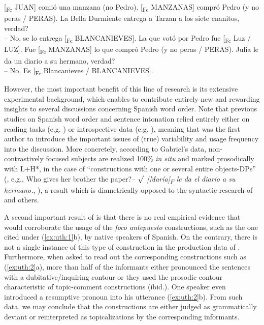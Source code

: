 \documentclass[output=paper]{langsci/langscibook}
\begin{document}
\ea%
    \label{ex:uth:1}
    \ea{}  [\textsubscript{Fc} JUAN] comió una manzana (no Pedro). 
    \ex{}  [\textsubscript{Fc} MANZANAS] compró Pedro (y no peras / PERAS). 
    \ex{}	La Bella Durmiente entrega a Tarzan a los siete enanitos, verdad? \\
      – No, se lo entrega [\textsubscript{Fc} BLANCANIEVES].
    \ex La que votó por Pedro fue [\textsubscript{Fc} Luz / LUZ].
    \ex Fue [\textsubscript{Fc} MANZANAS] lo que compró Pedro (y no peras / PERAS).
    \ex Julia le da un diario a su hermano, verdad?\\
      – No, Es [\textsubscript{Fc} Blancanieves / BLANCANIEVES]. 
      \z
      \z

However, the most important benefit of this line of research is its extensive experimental background, which enables \citet{Gabriel2007} to contribute entirely new and rewarding insights to several discussions concerning Spanish word order. Note that previous studies on Spanish word order and sentence intonation relied entirely either on reading tasks (e.g. \citealt{Dominguez04,Face2002,Hualde2005}) or introspective data (e.g. \citealt{Zubizarreta98,Zubizarreta99}), meaning that \citet{Gabriel2007} was the first author to introduce the important issues of (true) variability and usage frequency into the discussion. More concretely, according to Gabriel's data, non-contrastively focused subjects are realized 100\% \textit{in situ} and marked prosodically with L+H*, in the case of “constructions with one or several entire objects-DPs” (\citealt[290]{Gabriel2007}, e.g.‚ Who gives her brother the paper?\textit{– ${\surd}$ [María]\textsubscript{F} le da el diario a su hermano.}, \citealt[289]{Gabriel2007}), a result which is diametrically opposed to the syntactic research of \citet{Zubizarreta98,Zubizarreta99} and others.

A second important result of \citet{Gabriel2007} is that there is no real empirical evidence that would corroborate the usage of the \textit{foco antepuesto} constructions, such as the one cited under (\ref{ex:uth:1}b), by native speakers of Spanish. On the contrary, there is not a single instance of this type of construction in the production data of \citet[285]{Gabriel2007}. Furthermore, when asked to read out the corresponding constructions such as (\ref{ex:uth:2}a), more than half of the informants either pronounced the sentences with a dubitative/inquiring contour or they used the prosodic contour characteristic of topic-comment constructions (ibid.). One speaker even introduced a resumptive pronoun into his utterance (\ref{ex:uth:2}b). From such data, we may conclude that the constructions are either judged as grammatically deviant or reinterpreted as topicalizations by the corresponding informants.
\end{document}
